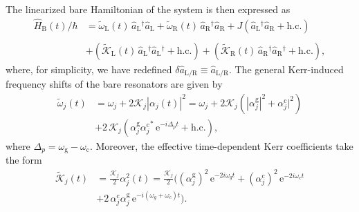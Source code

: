 \documentclass[%
reprint,
floatfix,
superscriptaddress,
amsmath,amssymb,
aps,
pra,
]{revtex4-2}
\newcommand*{\scrpt}[1]{\mathrm{#1}}
\newcommand*{\s}[1]{\ensuremath{_\scrpt{#1}}}
\begin{document}
The linearized bare Hamiltonian of the system is then expressed as
%
\begin{align}
\label{HB_lin}
\hat H\s{B} (t) / \hbar & = \tilde{\omega}\s{L}(t) \, \hat{a}\s{L}^{\dag} \hat{a}\s{L} + \tilde{\omega}\s{R} (t) \, \hat{a}\s{R}^{\dag} \hat{a}\s{R} + J \left(\hat a\s{L}^{\dag} \hat a\s{R}  + \mathrm{h.c.} \right) \nonumber 
\\
\\
& + \left( \tilde{\mathcal{K}}\s{L} (t) \, \hat{a}\s{L}^{\dag} \hat{a}\s{L}^{\dag} + \mathrm{h.c.} \right) + \left( \tilde{\mathcal{K}}\s{R} (t) \, \hat{a}\s{R}^{\dag} \hat{a}\s{R}^{\dag} + \mathrm{h.c.} \right), \nonumber 
\end{align}
%
where, for simplicity, we have redefined $\delta \hat{a}\s{L/R} \equiv \hat{a}\s{L/R}$. The general Kerr-induced frequency shifts of the bare resonators are given by
%
\begin{align}
\label{Par_Wshift}
\tilde{\omega}_j(t) & = \omega_j + 2 \mathcal{K}_j |\alpha_j(t)|^2  = \omega_j +  2 \mathcal{K}_j \left( |\alpha\mathrm{^{g}_\textit{j}}|^2 + \alpha\mathrm{^{c}_\textit{j}}|^2 \right) \nonumber \\
&  + 2 \, \mathcal{K}_j \left( \alpha\mathrm{^{g}_\textit{j}} \alpha\mathrm{^{c}_\textit{j}}^* \, \mathrm{e}^{-i \Delta_p t} + \mathrm{h.c.} \right), 
\end{align}
% 
where $\Delta_p = \omega\s{g} - \omega\s{c}$. Moreover, the effective time-dependent Kerr coefficients take the form 
%
\begin{align}
\label{Par_Kerrshift}
\tilde{\mathcal{K}}_j (t) & = \frac{\mathcal{K}_j}{2} \alpha_j^2(t)  = \frac{\mathcal{K}_j}{2} \Big( (\alpha\mathrm{^{g}_\textit{j}})^2 \, \mathrm{e}^{- 2 i \omega_{g} t} + (\alpha\mathrm{^{c}_\textit{j}})^2 \, \mathrm{e}^{- 2 i \omega_{c} t}  \nonumber \\
& + 2  \, \alpha\mathrm{^{c}_\textit{j}} \alpha\mathrm{^{g}_\textit{j}} \, \mathrm{e}^{-i (\omega_{g} + \omega_{c}) t} \Big).
\end{align}
% 
\end{document}
